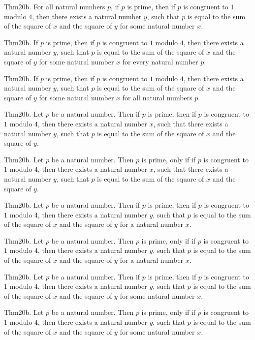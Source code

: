 \documentclass{article}
\begin{document}
Thm20b. For all natural numbers $p$, if $p$ is prime, then if $p$ is congruent to $1$ modulo $4$, then there exists a natural number $y$, such that $p$ is equal to the sum of the square of $x$ and the square of $y$ for some natural number $x$.

Thm20b. If $p$ is prime, then if $p$ is congruent to $1$ modulo $4$, then there exists a natural number $y$, such that $p$ is equal to the sum of the square of $x$ and the square of $y$ for some natural number $x$ for every natural number $p$.

Thm20b. If $p$ is prime, then if $p$ is congruent to $1$ modulo $4$, then there exists a natural number $y$, such that $p$ is equal to the sum of the square of $x$ and the square of $y$ for some natural number $x$ for all natural numbers $p$.

Thm20b. Let $p$ be a natural number. Then if $p$ is prime, then if $p$ is congruent to $1$ modulo $4$, then there exists a natural number $x$, such that there exists a natural number $y$, such that $p$ is equal to the sum of the square of $x$ and the square of $y$.

Thm20b. Let $p$ be a natural number. Then $p$ is prime, only if if $p$ is congruent to $1$ modulo $4$, then there exists a natural number $x$, such that there exists a natural number $y$, such that $p$ is equal to the sum of the square of $x$ and the square of $y$.

Thm20b. Let $p$ be a natural number. Then if $p$ is prime, then if $p$ is congruent to $1$ modulo $4$, then there exists a natural number $y$, such that $p$ is equal to the sum of the square of $x$ and the square of $y$ for a natural number $x$.

Thm20b. Let $p$ be a natural number. Then $p$ is prime, only if if $p$ is congruent to $1$ modulo $4$, then there exists a natural number $y$, such that $p$ is equal to the sum of the square of $x$ and the square of $y$ for a natural number $x$.

Thm20b. Let $p$ be a natural number. Then if $p$ is prime, then if $p$ is congruent to $1$ modulo $4$, then there exists a natural number $y$, such that $p$ is equal to the sum of the square of $x$ and the square of $y$ for some natural number $x$.

Thm20b. Let $p$ be a natural number. Then $p$ is prime, only if if $p$ is congruent to $1$ modulo $4$, then there exists a natural number $y$, such that $p$ is equal to the sum of the square of $x$ and the square of $y$ for some natural number $x$.
\end{document}
